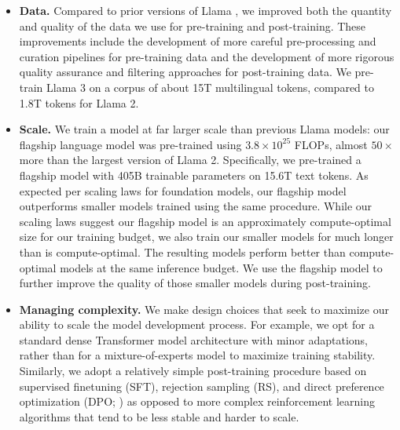 \documentclass[dvipsnames]{fairmeta}
\begin{document}
\begin{itemize}
\item \textbf{Data.} Compared to prior versions of Llama \citep{touvron2023llama,touvron2023llama2}, we improved both the quantity and quality of the data we use for pre-training and post-training.
These improvements include the development of more careful pre-processing and curation pipelines for pre-training data and the development of more rigorous quality assurance and filtering approaches for post-training data.
We pre-train Llama 3 on a corpus of about 15T multilingual tokens, compared to 1.8T tokens for Llama 2. 

\item \textbf{Scale.} We train a model at far larger scale than previous Llama models: our flagship language model was pre-trained using $3.8 \times 10^{25}$ FLOPs, almost $50\times$ more than the largest version of Llama 2. 
Specifically, we pre-trained a flagship model with 405B trainable parameters on 15.6T text tokens.
As expected per scaling laws for foundation models, our flagship model outperforms smaller models trained using the same procedure. 
While our scaling laws suggest our flagship model is an approximately compute-optimal size for our training budget, we also train our smaller models for much longer than is compute-optimal.
The resulting models perform better than compute-optimal models at the same inference budget.
We use the flagship model to further improve the quality of those smaller models during post-training. 

\item \textbf{Managing complexity.} We make design choices that seek to maximize our ability to scale the model development process. 
For example, we opt for a standard dense Transformer model architecture \citep{vaswani2017attention} with minor adaptations, rather than for a mixture-of-experts model \citep{shazeer2017moe} to maximize training stability. 
Similarly, we adopt a relatively simple post-training procedure based on supervised finetuning (SFT), rejection sampling (RS), and direct preference optimization (DPO; \citet{rafailov2023dpo}) as opposed to more complex reinforcement learning algorithms \citep{ouyang2022instructgpt,schulman2017proximal} that tend to be less stable and harder to scale. 
\end{itemize}
\end{document}
